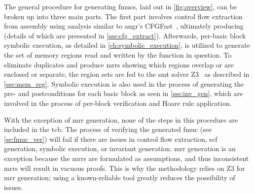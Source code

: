 The general procedure for generating \acp{fmuc}, laid out in \cref{fig:overview},
can be broken up into three main parts.
The first part involves control flow extraction from assembly using  analysis
similar to angr's CFGFast~\citep{shoshitaishvili2016state},
ultimately producing  (details of which are presented
in \cref{sse:cfg_extract}).
Afterwards, per-basic block symbolic execution,
as detailed in \cref{ch:symbolic_execution},
is utilized to generate the set of memory regions
read and written by the function in question.
To eliminate duplicates and produce \acp{mrr}
showing which regions overlap or are enclosed or separate,
the region sets are fed to the \ac{smt} solver Z3~\citep{de2008z3}
as described in \cref{sse:mem_reg}.
Symbolic execution is also used in the process of generating
the pre- and postconditions for each basic block as seen in \cref{sse:inv_gen},
which are involved in the process of per-block verification
and Hoare rule application.

With the exception of \ac{mrr} generation,
none of the steps in this procedure are included in the \ac{tcb}.
The process of verifying the generated \ac{fmuc} (see \cref{se:fmuc_ver})
will fail if there are issues in control flow extraction,
\ac{scf} generation, symbolic execution, or invariant generation.
\Ac{mrr} generation is an exception
because the \acp{mrr} are formulated as assumptions,
and thus inconsistent \acp{mrr} will result in vacuous proofs.
This is why the methodology relies on Z3 for \ac{mrr} generation;
using a known-reliable tool greatly reduces the possibility of issues.

